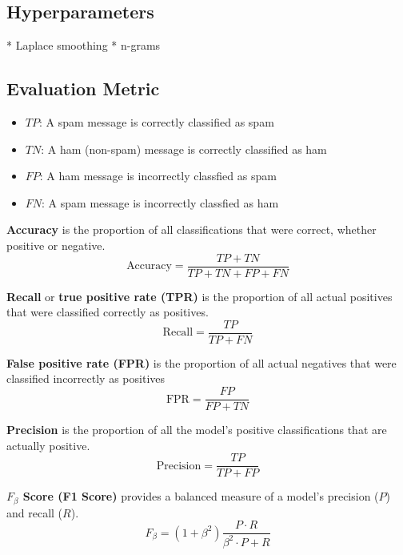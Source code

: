 

\subsection{Hyperparameters}

* Laplace smoothing
* n-grams




\subsection{Evaluation Metric \cite{google_accuracy}}

\begin{itemize}
    \item $TP$: A spam message is correctly classified as spam
    \item $TN$: A ham (non-spam) message is correctly classified as ham
    \item $FP$: A ham message is incorrectly classfied as spam
    \item $FN$: A spam message is incorrectly classfied as ham
\end{itemize}


\textbf{Accuracy} is the proportion of all classifications that were correct, whether positive or negative.
\begin{equation}
    \text{Accuracy} = \frac{TP + TN}{TP + TN + FP + FN}
\end{equation}

\textbf{Recall} or \textbf{true positive rate (TPR)} is the proportion of all actual positives that were classified correctly as positives.
\begin{equation}
    \text{Recall} = \frac{TP}{TP + FN}
\end{equation}

\textbf{False positive rate (FPR)} is the proportion of all actual negatives that were classified incorrectly as positives
\begin{equation}
    \text{FPR} = \frac{FP}{FP + TN}
\end{equation}

\textbf{Precision} is the proportion of all the model's positive classifications that are actually positive.
\begin{equation}
    \text{Precision} = \frac{TP}{TP + FP}
\end{equation}

\textbf{$F_\beta$ Score (F1 Score)} provides a balanced measure of a model's precision ($P$) and recall ($R$).
\begin{equation}
    F_\beta = (1 + \beta^2) \frac{P \cdot R}{\beta^2 \cdot P + R}
\end{equation}

